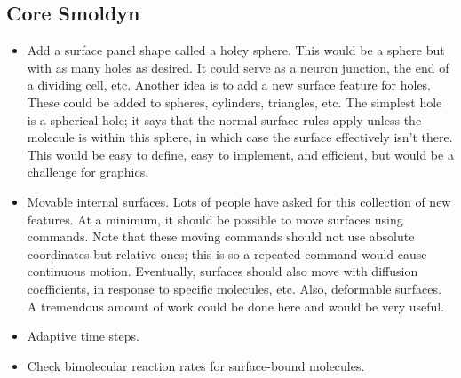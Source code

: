 \documentclass {scrbook}
\begin{document}
\subsection{Core Smoldyn}
\begin{itemize}
\item Add a surface panel shape called a holey sphere. This would be a sphere but with as many holes as desired. It could serve as a neuron junction, the end of a dividing cell, etc. Another idea is to add a new surface feature for holes. These could be added to spheres, cylinders, triangles, etc. The simplest hole is a spherical hole; it says that the normal surface rules apply unless the molecule is within this sphere, in which case the surface effectively isn't there. This would be easy to define, easy to implement, and efficient, but would be a challenge for graphics.
\item Movable internal surfaces. Lots of people have asked for this collection of new features. At a minimum, it should be possible to move surfaces using commands. Note that these moving commands should not use absolute coordinates but relative ones; this is so a repeated command would cause continuous motion. Eventually, surfaces should also move with diffusion coefficients, in response to specific molecules, etc. Also, deformable surfaces. A tremendous amount of work could be done here and would be very useful.
\item Adaptive time steps.
\item Check bimolecular reaction rates for surface-bound molecules.
\end{itemize}
\end{document}
